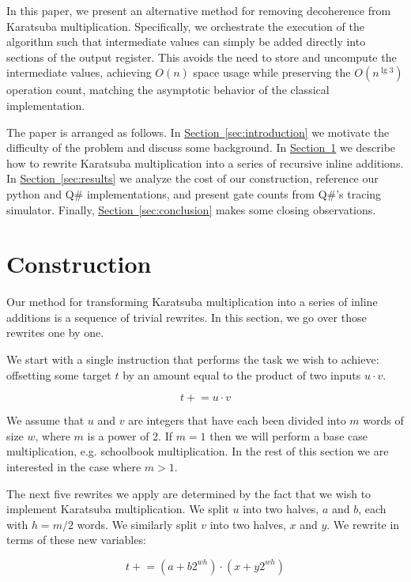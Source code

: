 \documentclass[onecolumn,unpublished]{quantumarticle}
\renewcommand{\sec}[1]{\hyperref[sec:#1]{Section~\ref*{sec:#1}}}
\begin{document}
In this paper, we present an alternative method for removing decoherence from Karatsuba multiplication.
Specifically, we orchestrate the execution of the algorithm such that intermediate values can simply be added directly into sections of the output register.
This avoids the need to store and uncompute the intermediate values, achieving $O(n)$ space usage while preserving the $O(n^{\lg 3})$ operation count, matching the asymptotic behavior of the classical implementation.

The paper is arranged as follows.
In \sec{introduction} we motivate the difficulty of the problem and discuss some background.
In \sec{methods} we describe how to rewrite Karatsuba multiplication into a series of recursive inline additions.
In \sec{results} we analyze the cost of our construction, reference our python and Q\# implementations, and present gate counts from Q\#'s tracing simulator.
Finally, \sec{conclusion} makes some closing observations.

\section{Construction}
\label{sec:methods}

\newcommand{\pluseq}{\mathrel{+}=}
\newcommand{\minuseq}{\mathrel{-}=}
\newcommand{\timeseq}{\mathrel{\ast}=}

Our method for transforming Karatsuba multiplication into a series of inline additions is a sequence of trivial rewrites.
In this section, we go over those rewrites one by one.

We start with a single instruction that performs the task we wish to achieve: offsetting some target $t$ by an amount equal to the product of two inputs $u \cdot v$.

$$t \pluseq u \cdot v$$

We assume that $u$ and $v$ are integers that have each been divided into $m$ words of size $w$, where $m$ is a power of 2.
If $m=1$ then we will perform a base case multiplication, e.g. schoolbook multiplication.
In the rest of this section we are interested in the case where $m>1$.

The next five rewrites we apply are determined by the fact that we wish to implement Karatsuba multiplication.
We split $u$ into two halves, $a$ and $b$, each with $h=m/2$ words.
We similarly split $v$ into two halves, $x$ and $y$.
We rewrite in terms of these new variables:

$$t \pluseq (a + b 2^{wh}) \cdot (x + y 2^{wh})$$
\end{document}
